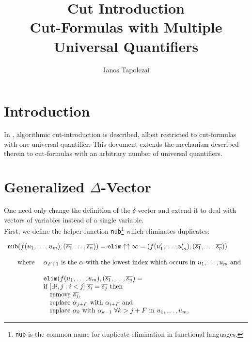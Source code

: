 \documentclass[a4paper, 11pt]{report}
\title{Cut Introduction\\ \vspace{0.5cm} Cut-Formulas with Multiple Universal Quantifiers}
\author{Janos Tapolczai}
\newcommand{\mt}[1]{\textnormal{#1}}
\begin{document}
\maketitle

\section{Introduction}

In \cite[Ch. 5]{cutIntro2013}, algorithmic cut-introduction is described, albeit restricted to cut-formulas with
one universal quantifier. This document extends the mechanism described therein to cut-formulas with an
arbitrary number of universal quantifiers.

\section{Generalized $\Delta$-Vector}

One need only change the definition of the $\delta$-vector and extend it to deal with vectors of variables
instead of a single variable.\\

\noindent
First, we define the helper-function \texttt{nub}\footnote{\texttt{nub} is the common name for duplicate elimination in functional languages.} which eliminates duplicates:

$$
  \begin{array}{l}
    \texttt{nub}(f(u_1,\dots,u_m), (\overline{s_1},\dots,\overline{s_n})) = \texttt{elim} \uparrow \uparrow \infty =
    (f(u_1',\dots,u_m'), (\overline{s_1},\dots,\overline{s_p}))\\

    \\

    \quad 
      \begin{array}{l l}
        \mt{where } &
        \alpha_{F+1} \mt{ is the } \alpha \mt{ with the lowest index which occurs in } u_1,\dots,u_m \mt{ and}\\

        \\

        & \texttt{elim}(f(u_1,\dots,u_m), (\overline{s_1},\dots,\overline{s_n}) =\\
        & \mt{if } [\exists i,j: i < j]\ \overline{s_{i}} = \overline{s_{j}} \mt { then}\\
        & \quad \mt{remove } \overline{s_{j}},\\
        & \quad \mt{replace } \alpha_{j+F} \mt { with } \alpha_{i+F} \mt{ and }\\
        & \quad \mt{replace } \alpha_k \mt{ with } \alpha_{k-1}\ \forall k > j+F \mt{ in } u_1,\dots,u_m \mt{.}
        \\
      \end{array}
  \end{array}
$$
\end{document}
